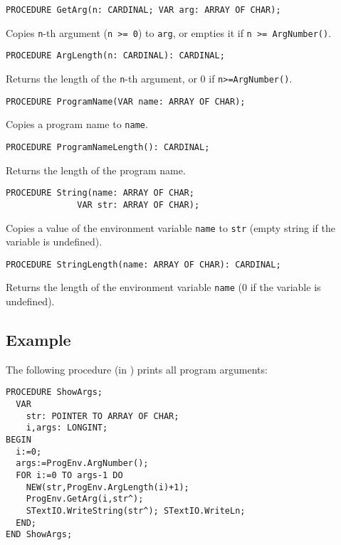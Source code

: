 {\samepage
{}
\begin{verbatim}
PROCEDURE GetArg(n: CARDINAL; VAR arg: ARRAY OF CHAR);
\end{verbatim}
}
\ModuleList
Copies \verb'n'-th argument (\verb'n >= 0') to {\tt arg}, or empties it
if \verb|n >= ArgNumber()|.

{\samepage
{}
\begin{verbatim}
PROCEDURE ArgLength(n: CARDINAL): CARDINAL;
\end{verbatim}
}
\ModuleList
Returns the length of the \verb'n'-th argument, or
0 if \verb|n>=ArgNumber()|.

{\samepage
{}
\begin{verbatim}
PROCEDURE ProgramName(VAR name: ARRAY OF CHAR);
\end{verbatim}
}
\ModuleList
Copies a program name to {\tt name}.

{\samepage
{}
\begin{verbatim}
PROCEDURE ProgramNameLength(): CARDINAL;
\end{verbatim}
}
\ModuleList
Returns the length of the program name.

{\samepage
{}
\begin{verbatim}
PROCEDURE String(name: ARRAY OF CHAR;
              VAR str: ARRAY OF CHAR);
\end{verbatim}
}
\ModuleList
Copies a value of the environment variable {\tt name} to {\tt str}
(empty string if the variable is undefined).

{\samepage
{}
\begin{verbatim}
PROCEDURE StringLength(name: ARRAY OF CHAR): CARDINAL;
\end{verbatim}
}
\ModuleList
Returns the length of the environment variable {\tt name}
(0 if the variable is undefined).

\subsection{Example}

The following procedure (in \ot{}) prints all program arguments:
\begin{verbatim}
PROCEDURE ShowArgs;
  VAR
    str: POINTER TO ARRAY OF CHAR;
    i,args: LONGINT;
BEGIN
  i:=0;
  args:=ProgEnv.ArgNumber();
  FOR i:=0 TO args-1 DO
    NEW(str,ProgEnv.ArgLength(i)+1);
    ProgEnv.GetArg(i,str^);
    STextIO.WriteString(str^); STextIO.WriteLn;
  END;
END ShowArgs;
\end{verbatim}

